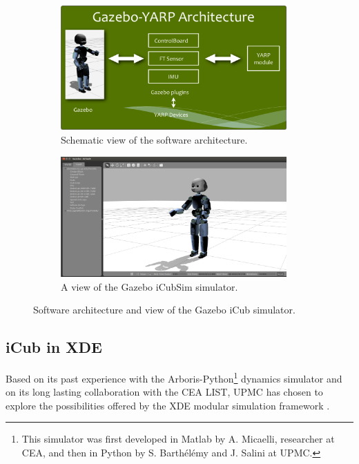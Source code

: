 \documentclass[12pt,a4paper,twoside]{article}
\begin{document}
\begin{figure}[h]
\begin{center}
\begin{subfigure}[b]{0.49\textwidth}
\centering
\includegraphics[width=0.95\textwidth]{gazebo-yarp-architecture.png} 
\caption{Schematic view of the software architecture.}
\label{fig:iCubSimGaz-arch}
\end{subfigure}
\begin{subfigure}[b]{0.49\textwidth}
\centering
\includegraphics[width=0.95\textwidth]{sim_gazebo.png}
\caption{A view of the Gazebo iCubSim simulator.}
\label{fig:iCubSimGaz-view}
\end{subfigure}
\caption{Software architecture and view of the Gazebo iCub simulator.}
\end{center}
\end{figure}

\subsection{iCub in XDE}

Based on its past experience with the Arboris-Python\footnote{This simulator was first developed in Matlab by A. Micaelli, researcher at CEA, and then in Python by S. Barth\'el\'emy and J. Salini at UPMC.} dynamics simulator \cite{Arboris-Python} and on its long lasting collaboration with the CEA LIST, UPMC has chosen to explore the possibilities offered by the XDE modular simulation framework \cite{XDE}.\\
\end{document}

